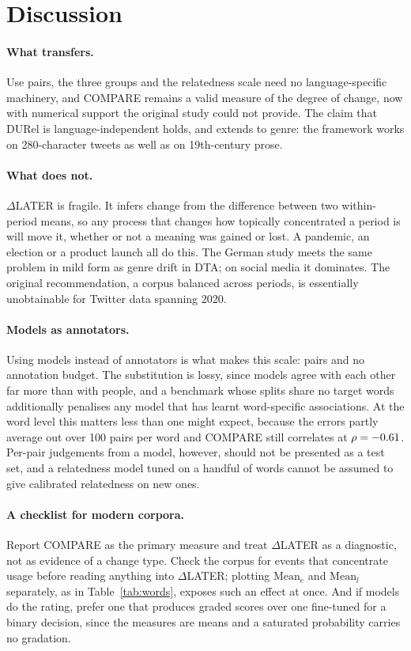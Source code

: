 \documentclass{article}
\newif\iffirstsectiondone
\let\originalsection\section
\renewcommand{\section}{%
  \iffirstsectiondone\Needspace*{0.12\textheight}\else\firstsectiondonetrue\fi
  \originalsection}
\begin{document}
\section{Discussion}

\paragraph{What transfers.} Use pairs, the three groups and the relatedness scale
need no language-specific machinery, and COMPARE remains a valid measure of the
degree of change, now with numerical support the original study could not
provide. The claim that DURel is language-independent holds, and extends to
genre: the framework works on 280-character tweets as well as on 19th-century
prose.

\paragraph{What does not.} $\Delta$LATER is fragile. It infers change from the
difference between two within-period means, so any process that changes how
topically concentrated a period is will move it, whether or not a meaning was
gained or lost. A pandemic, an election or a product launch all do this. The
German study meets the same problem in mild form as genre drift in DTA; on
social media it dominates. The original recommendation, a corpus balanced across
periods, is essentially unobtainable for Twitter data spanning 2020.

\paragraph{Models as annotators.} Using models instead of annotators is what
makes this scale: \numTotalPairs{} pairs and no annotation budget. The
substitution is lossy, since models agree with each other far more than with
people, and a benchmark whose splits share no target words additionally
penalises any model that has learnt word-specific associations. At the word
level this matters less than one might expect, because the errors partly average
out over 100 pairs per word and COMPARE still correlates at $\rho=-0.61$.
Per-pair judgements from a model, however, should not be presented as a test
set, and a relatedness model tuned on a handful of words cannot be assumed to
give calibrated relatedness on new ones.

\paragraph{A checklist for modern corpora.} Report COMPARE as the primary
measure and treat $\Delta$LATER as a diagnostic, not as evidence of a change
type. Check the corpus for events that concentrate usage before reading anything
into $\Delta$LATER; plotting $\mathrm{Mean}_e$ and $\mathrm{Mean}_l$ separately,
as in Table~\ref{tab:words}, exposes such an effect at once. And if models do the
rating, prefer one that produces graded scores over one fine-tuned for a binary
decision, since the measures are means and a saturated probability carries no
gradation.
\end{document}
